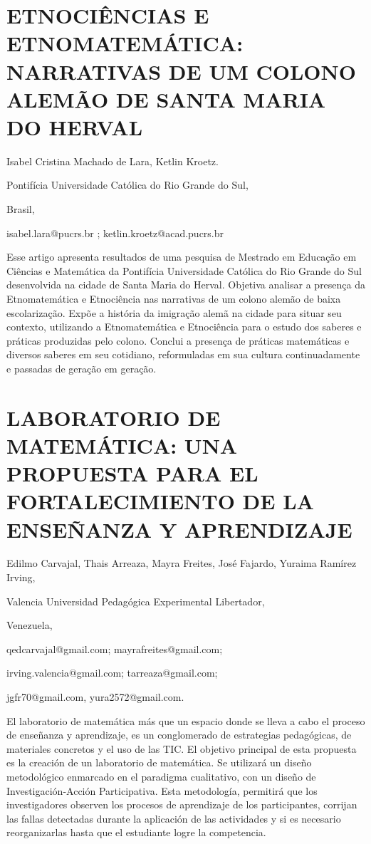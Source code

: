 \section{ETNOCIÊNCIAS E ETNOMATEMÁTICA: NARRATIVAS DE UM COLONO ALEMÃO DE
SANTA MARIA DO HERVAL}

\begin{datos}

Isabel Cristina Machado de Lara, Ketlin Kroetz.

Pontifícia Universidade Católica do Rio Grande do Sul, 

Brasil,

isabel.lara@pucrs.br ; ketlin.kroetz@acad.pucrs.br

\end{datos}

Esse artigo apresenta resultados de uma pesquisa de Mestrado em Educação
em Ciências e Matemática da Pontifícia Universidade Católica do Rio
Grande do Sul desenvolvida na cidade de Santa Maria do Herval. Objetiva
analisar a presença da Etnomatemática e Etnociência nas narrativas
de um colono alemão de baixa escolarização. Expõe a história da imigração
alemã na cidade para situar seu contexto, utilizando a Etnomatemática
e Etnociência para o estudo dos saberes e práticas produzidas pelo
colono. Conclui a presença de práticas matemáticas e diversos saberes
em seu cotidiano, reformuladas em sua cultura continuadamente e passadas
de geração em geração.


\section{LABORATORIO DE MATEMÁTICA: UNA PROPUESTA PARA EL FORTALECIMIENTO
DE LA ENSEÑANZA Y APRENDIZAJE}

\begin{datos}

Edilmo Carvajal, Thais Arreaza, Mayra Freites, José Fajardo, Yuraima
Ramírez Irving,

Valencia Universidad Pedagógica Experimental Libertador,

Venezuela,

qedcarvajal@gmail.com; mayrafreites@gmail.com;

irving.valencia@gmail.com; tarreaza@gmail.com; 

jgfr70@gmail.com, yura2572@gmail.com.

\end{datos}

El laboratorio de matemática más que un espacio donde se lleva a cabo
el proceso de enseñanza y aprendizaje, es un conglomerado de estrategias
pedagógicas, de materiales concretos y el uso de las TIC. El objetivo
principal de esta propuesta es la creación de un laboratorio de matemática.
Se utilizará un diseño metodológico enmarcado en el paradigma cualitativo,
con un diseño de Investigación-Acción Participativa. Esta metodología,
permitirá que los investigadores observen los procesos de aprendizaje
de los participantes, corrijan las fallas detectadas durante la aplicación
de las actividades y si es necesario reorganizarlas hasta que el estudiante
logre la competencia.


